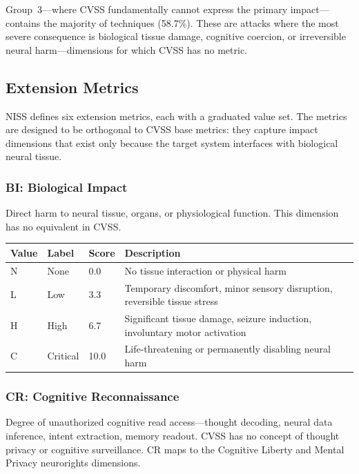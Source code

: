 Group~3---where CVSS fundamentally cannot express the primary impact---contains
the majority of techniques (58.7\%). These are attacks where the most severe
consequence is biological tissue damage, cognitive coercion, or irreversible
neural harm---dimensions for which CVSS has no metric.

\subsection{Extension Metrics}

NISS defines six extension metrics, each with a graduated value set. The
metrics are designed to be orthogonal to CVSS base metrics: they capture impact
dimensions that exist only because the target system interfaces with biological
neural tissue.

\subsubsection{BI: Biological Impact}

Direct harm to neural tissue, organs, or physiological function. This dimension
has no equivalent in CVSS.

\begin{table}[H]
\centering
\small
\begin{tabular}{@{}l l l p{7cm}@{}}
\toprule
\textbf{Value} & \textbf{Label} & \textbf{Score} & \textbf{Description} \\
\midrule
N & None     & 0.0  & No tissue interaction or physical harm \\
L & Low      & 3.3  & Temporary discomfort, minor sensory disruption, reversible tissue stress \\
H & High     & 6.7  & Significant tissue damage, seizure induction, involuntary motor activation \\
C & Critical & 10.0 & Life-threatening or permanently disabling neural harm \\
\bottomrule
\end{tabular}
\end{table}

\subsubsection{CR: Cognitive Reconnaissance}

Degree of unauthorized cognitive read access---thought decoding, neural data
inference, intent extraction, memory readout. CVSS has no concept of thought
privacy or cognitive surveillance. CR maps to the Cognitive Liberty and Mental
Privacy neurorights dimensions.


